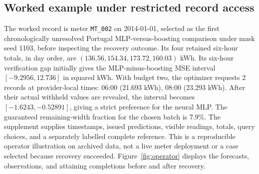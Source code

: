 \documentclass[12pt]{article}
\begin{document}
\subsection{Worked example under restricted record access}\label{app:worked-audit}
The worked record is meter \texttt{MT\_002} on
2014-01-01, selected as the first chronologically unresolved Portugal
MLP-versus-boosting comparison under mask seed 1103, before inspecting
the recovery outcome. Its four retained six-hour totals, in day order,
are $(136.56, 154.34, 173.72, 160.03)$ kWh. Its six-hour verification gap initially gives the
MLP-minus-boosting MSE interval $[-9.2956,12.736]$
in squared kWh. With budget two, the optimizer requests 2
records at provider-local times: 06:00 (21.693 kWh), 08:00 (23.293 kWh). After their actual withheld values are
revealed, the interval becomes $[-1.6243,-0.52891]$,
giving a strict preference for the neural MLP. The guaranteed remaining-width fraction for the
chosen batch is 7.9\%.
The supplement supplies timestamps, issued predictions, visible readings,
totals, query choices, and a separately labelled complete reference. This
is a reproducible operator illustration on archived data, not a live meter
deployment or a case selected because recovery succeeded. Figure~\ref{fig:operator}
displays the forecasts, observations, and attaining completions before and
after recovery.
\end{document}
